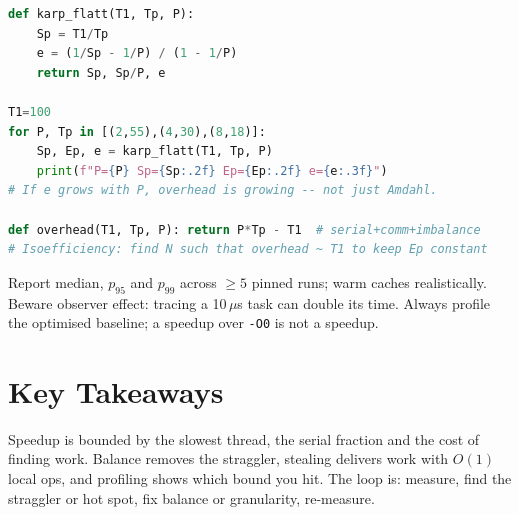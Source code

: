 \begin{lstlisting}[language=Python, caption={Karp--Flatt, isoefficiency and overhead breakdown.}, label={lst:profile}]
def karp_flatt(T1, Tp, P):
    Sp = T1/Tp
    e = (1/Sp - 1/P) / (1 - 1/P)
    return Sp, Sp/P, e

T1=100
for P, Tp in [(2,55),(4,30),(8,18)]:
    Sp, Ep, e = karp_flatt(T1, Tp, P)
    print(f"P={P} Sp={Sp:.2f} Ep={Ep:.2f} e={e:.3f}")
# If e grows with P, overhead is growing -- not just Amdahl.

def overhead(T1, Tp, P): return P*Tp - T1  # serial+comm+imbalance
# Isoefficiency: find N such that overhead ~ T1 to keep Ep constant
\end{lstlisting}

Report median, $p_{95}$ and $p_{99}$ across $\ge5$ pinned runs; warm caches realistically. Beware observer effect: tracing a 10\,$\mu$s task can double its time. Always profile the optimised baseline; a speedup over \texttt{-O0} is not a speedup.

\section*{Key Takeaways}
Speedup is bounded by the slowest thread, the serial fraction and the cost of finding work. Balance removes the straggler, stealing delivers work with $O(1)$ local ops, and profiling shows which bound you hit. The loop is: measure, find the straggler or hot spot, fix balance or granularity, re-measure.

